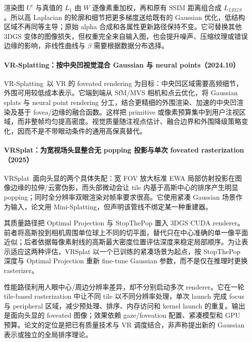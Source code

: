 渲染图 $U^i$ 与真值的 $L_1$ 由 $W$ 逐像素重加权，再和原有 SSIM 距离组合成 $L_{LEGS}$。所以高 Laplacian 的轮廓和细节把更多梯度送给既有的 Gaussian 优化，低结构区域不再同等主导；原始 alpha 合成和各属性更新路径保持不变。它可替换其他 3DGS 变体的图像损失，但权重完全来自输入图，也会提升噪声、压缩纹理或错误边缘的影响，非线性曲线与 $\beta$ 需要根据数据分布选择。

\paragraph{VR-Splatting：按中央凹视觉混合 Gaussian 与 neural points（2024.10）}
VR-Splatting~\cite{2410_17932}以 VR 的 foveated rendering 为目标：中央凹区域需要高频细节，外围可用较低成本表示。它端到端从 SfM/MVS 相机和点云优化，将 Gaussian splats 与 neural point rendering 分工，结合更精细的外围渲染、加速的中央凹渲染及基于 fovea/边缘的融合函数。这样把 primitive 或像素预算集中到用户注视区域，而非整帧均匀提高密度。视觉质量随注视点估计、融合边界和外围降级策略变化，因而不是不带眼动条件的通用高保真替代。


\paragraph{VRSplat：为宽视场头显整合无 popping 投影与单次 foveated rasterization（2025）\cite{2505_10144}}
VRSplat~\cite{2505_10144}面向头显的两个具体失配：宽 FOV 放大标准 EWA 局部仿射投影在图像边缘的拉伸/云雾伪影，而头部微动会让 tile 内基于高斯中心的排序产生明显 popping；同时全分辨率双眼渲染对帧率要求很高。它使用紧凑 Gaussian 场景作为输入，论文用 Mini-Splatting，但声明该管线不绑定某一种重建器。

其质量路径把 Optimal Projection 与 StopThePop 置入 3DGS CUDA renderer。前者将高斯投到相机周围单位球上不同的切平面，替代只在中心准确的单一像平面近似；后者依据每像素射线的高斯最大密度位置评估深度来稳定局部顺序。为让表示适应这两种评估，VRSplat 以一个已训练的紧凑场景为起点，按 StopThePop 深度与 Optimal Projection 重新 fine-tune Gaussian 参数，而不是仅在推理时更换 rasterizer。

性能路径利用人眼中心/周边分辨率差异，却不分别启动多次 renderer。它在一轮 tile-based rasterization 中让不同 tile 以不同分辨率处理，单次 launch 完成 focus 与 peripheral 区域，减少预处理、排序、内存访问和 kernel launch 的重复。输出是面向头显的 foveated 图像；效果依赖 gaze/foveation 配置、紧凑模型和 GPU 预算。论文的定位是把已有质量技术与 VR 调度结合，非声称提出新的 Gaussian 表示或独立的全局排序理论。

